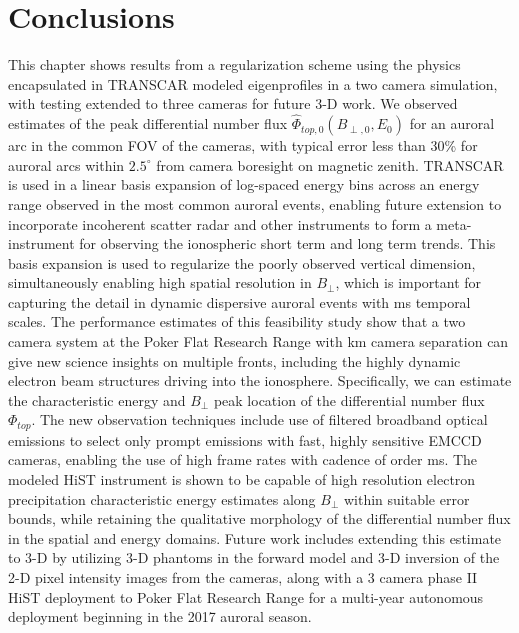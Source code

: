 \section{Conclusions}\label{sec:concl}
This chapter shows results from a regularization scheme using the physics encapsulated in TRANSCAR modeled eigenprofiles in a two camera simulation, with testing extended to three cameras for future 3-D work.
We observed estimates of the peak differential number flux $\hat{\Phi}_{top,0}(B_{\perp,0},E_0)$ for an auroral arc in the common FOV of the cameras, with typical error less than 30\% for auroral arcs within $2.5^\circ$ from camera boresight on magnetic zenith. 
TRANSCAR is used in a linear basis expansion of log-spaced energy bins across an energy range observed in the most common auroral events, enabling future extension to incorporate incoherent scatter radar and other instruments to form a meta-instrument for observing the ionospheric short term and long term trends.
This basis expansion is used to regularize the poorly observed vertical dimension, simultaneously enabling  high spatial resolution in $B_\perp$, which is important for capturing the detail in dynamic dispersive auroral events with \unit[10]{ms} temporal scales.
The performance estimates of this feasibility study show that a two camera system at the Poker Flat Research Range with \unit[3]{km} camera separation can give new science insights on multiple fronts, including the highly dynamic electron beam structures driving into the ionosphere.
Specifically, we can estimate the characteristic energy and $B_\perp$ peak location of the differential number flux $\Phi_{top}$.
The new observation techniques include use of filtered broadband optical emissions to select only prompt emissions with fast, highly sensitive EMCCD cameras, enabling the use of high frame rates with cadence of order \unit[10]{ms}.
The modeled HiST instrument is shown to be capable of high resolution electron precipitation characteristic energy estimates along $B_\perp$ within suitable error bounds, while retaining the qualitative morphology of the differential number flux in the spatial and energy domains.
Future work includes extending this estimate to 3-D by utilizing 3-D phantoms in the forward model and 3-D inversion of the 2-D pixel intensity images from the cameras, along with a 3 camera phase II HiST deployment to Poker Flat Research Range for a multi-year autonomous deployment beginning in the 2017 auroral season.
